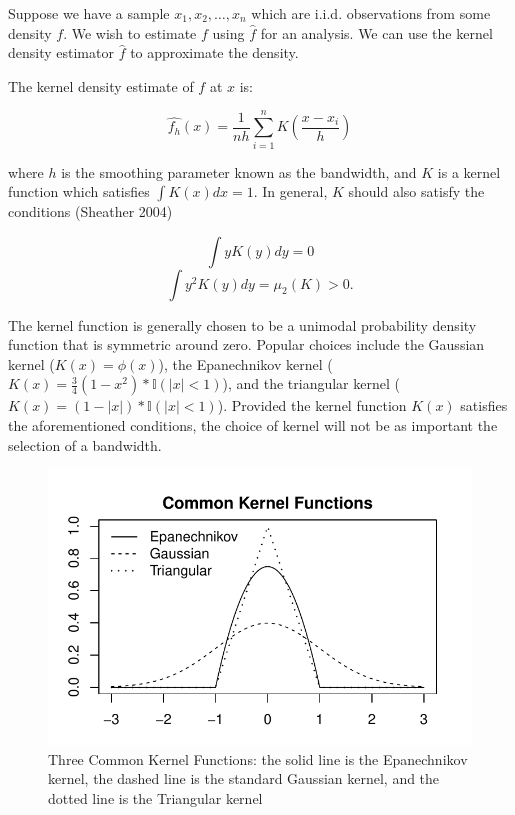 \documentclass[]{article}
\begin{document}
Suppose we have a sample \(x_1, x_2, \ldots, x_n\) which are i.i.d.
observations from some density \(f\). We wish to estimate \(f\) using
\(\hat{f}\) for an analysis. We can use the kernel density estimator
\(\hat{f}\) to approximate the density.

The kernel density estimate of \(f\) at \(x\) is:

\[\widehat{f_h}(x) = \frac{1}{nh} \sum_{i = 1}^{n}K\left(\frac{x - x_i}{h}\right) \]

where \(h\) is the smoothing parameter known as the bandwidth, and \(K\)
is a kernel function which satisfies \(\int{K(x)dx} = 1\). In general,
\(K\) should also satisfy the conditions (Sheather 2004)

\[\int{yK(y)dy} = 0\] \[\int{y^2K(y)dy} = \mu_2(K) > 0.\]

The kernel function is generally chosen to be a unimodal probability
density function that is symmetric around zero. Popular choices include
the Gaussian kernel (\(K(x) = \phi(x)\)), the Epanechnikov kernel
(\(K(x) = \frac{3}{4}(1-x^2)*\mathbb{I}(|x| <1)\)), and the triangular
kernel (\(K(x) = (1 - |x|)*\mathbb{I}(|x| < 1)\)). Provided the kernel
function \(K(x)\) satisfies the aforementioned conditions, the choice of
kernel will not be as important the selection of a bandwidth.

\begin{figure}[htbp]
\centering
\includegraphics{FinalReport_files/figure-latex/unnamed-chunk-2-1.pdf}
\caption{Three Common Kernel Functions: the solid line is the
Epanechnikov kernel, the dashed line is the standard Gaussian kernel,
and the dotted line is the Triangular kernel}
\end{figure}
\end{document}
